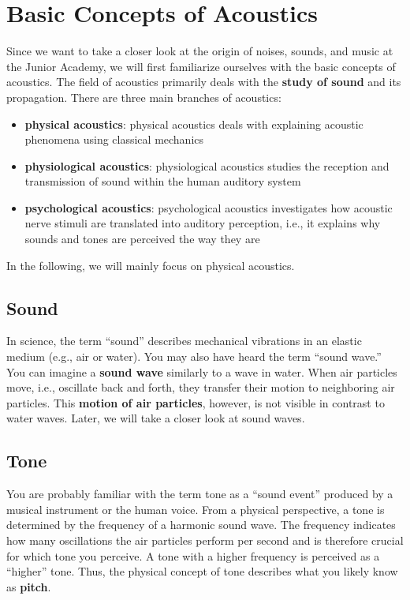 \section{Basic Concepts of Acoustics}
Since we want to take a closer look at the origin of noises, sounds, and music at the Junior Academy, we will first familiarize ourselves with the basic concepts of acoustics. The field of acoustics primarily deals with the \textbf{study of sound} and its propagation. There are three main branches of acoustics:
\begin{itemize}
    \item \textbf{physical acoustics}: physical acoustics deals with explaining acoustic phenomena using classical mechanics
    \item \textbf{physiological acoustics}: physiological acoustics studies the reception and transmission of sound within the human auditory system
    \item \textbf{psychological acoustics}: psychological acoustics investigates how acoustic nerve stimuli are translated into auditory perception, i.e., it explains why sounds and tones are perceived the way they are
\end{itemize}
In the following, we will mainly focus on physical acoustics.

\subsection{Sound}
In science, the term ``sound'' describes mechanical vibrations in an elastic medium (e.g., air or water). You may also have heard the term ``sound wave.'' You can imagine a \textbf{sound wave} similarly to a wave in water. When air particles move, i.e., oscillate back and forth, they transfer their motion to neighboring air particles. This \textbf{motion of air particles}, however, is not visible in contrast to water waves. Later, we will take a closer look at sound waves.
 
\subsection{Tone}
You are probably familiar with the term tone as a ``sound event'' produced by a musical instrument or the human voice. From a physical perspective, a tone is determined by the frequency of a harmonic sound wave. The frequency indicates how many oscillations the air particles perform per second and is therefore crucial for which tone you perceive. A tone with a higher frequency is perceived as a ``higher'' tone. Thus, the physical concept of tone describes what you likely know as \textbf{pitch}.


